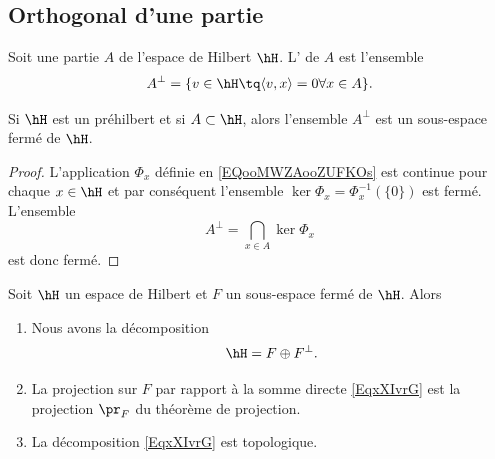 \subsection{Orthogonal d'une partie}

\begin{definition}  \label{DEFooXUXQooMmDnhW}
	Soit une partie \( A\) de l'espace de Hilbert \( \hH\). L' de \( A\) est l'ensemble
	\begin{equation}
		A^{\perp}=\{ v\in\hH\tq \langle v, x\rangle =0\forall x\in A \}.
	\end{equation}
\end{definition}

\begin{proposition}     \label{PropdpaMpH}
	Si \( \hH\) est un préhilbert et si \( A\subset \hH\), alors l'ensemble \( A^{\perp}\) est un sous-espace fermé de \( \hH\).
\end{proposition}

\begin{proof}
	L'application \( \Phi_x\) définie en \eqref{EQooMWZAooZUFKOs} est continue pour chaque \( x\in\hH\) et par conséquent l'ensemble \( \ker\Phi_x=\Phi_x^{-1}(\{ 0 \})\) est fermé. L'ensemble
	\begin{equation}
		A^{\perp}=\bigcap_{x\in A}\ker\Phi_x
	\end{equation}
	est donc fermé.
\end{proof}

\begin{theorem}     \label{ThowZyaiz}
	Soit \( \hH\) un espace de Hilbert et \( F\) un sous-espace fermé de \( \hH\). Alors
	\begin{enumerate}
		\item
		      Nous avons la décomposition
		      \begin{equation}        \label{EqxXIvrG}
			      \hH=F\oplus F^{\perp}.
		      \end{equation}
		\item       \label{ItemThowZyaizii}
		      La projection sur \( F\) par rapport à la somme directe \eqref{EqxXIvrG} est la projection \( \pr_F\) du théorème de projection.
		\item
		      La décomposition \eqref{EqxXIvrG} est topologique.
	\end{enumerate}
\end{theorem}


